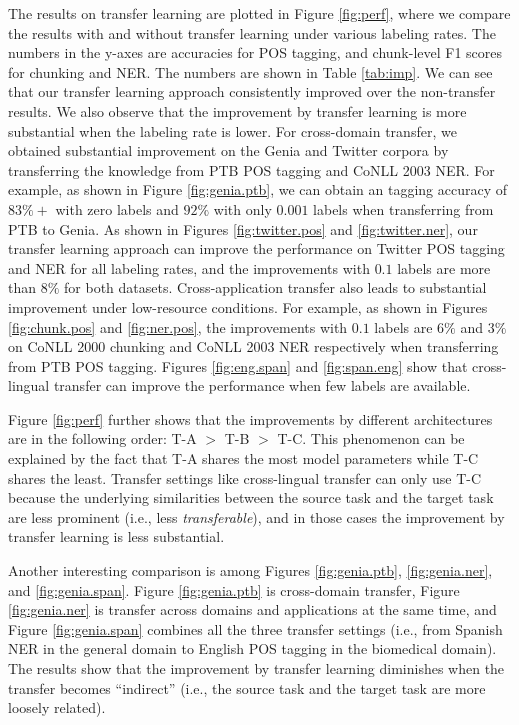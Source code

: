 The results on transfer learning are plotted in Figure \ref{fig:perf}, where we compare the results with and without transfer learning under various labeling rates. The numbers in the y-axes are accuracies for POS tagging, and chunk-level F1 scores for chunking and NER. The numbers are shown in Table \ref{tab:imp}. We can see that our transfer learning approach consistently improved over the non-transfer results. We also observe that the improvement by transfer learning is more substantial when the labeling rate is lower. For cross-domain transfer, we obtained substantial improvement on the Genia and Twitter corpora by transferring the knowledge from PTB POS tagging and CoNLL 2003 NER. For example, as shown in Figure \ref{fig:genia.ptb}, we can obtain an tagging accuracy of $83\%+$ with zero labels and $92\%$ with only $0.001$ labels when transferring from PTB to Genia. As shown in Figures \ref{fig:twitter.pos} and \ref{fig:twitter.ner}, our transfer learning approach can improve the performance on Twitter POS tagging and NER for all labeling rates, and the improvements with $0.1$ labels are more than $8\%$ for both datasets. Cross-application transfer also leads to substantial improvement under low-resource conditions. For example, as shown in Figures \ref{fig:chunk.pos} and \ref{fig:ner.pos}, the improvements with $0.1$ labels are $6\%$ and $3\%$ on CoNLL 2000 chunking and CoNLL 2003 NER respectively when transferring from PTB POS tagging. Figures \ref{fig:eng.span} and \ref{fig:span.eng} show that cross-lingual transfer can improve the performance when few labels are available.

Figure \ref{fig:perf} further shows that the improvements by different architectures are in the following order: T-A $>$ T-B $>$ T-C. This phenomenon can be explained by the fact that T-A shares the most model parameters while T-C shares the least. 
Transfer settings like cross-lingual transfer can only use T-C because the underlying similarities between the source task and the target task are less prominent (i.e., less \textit{transferable}), and in those cases the improvement by transfer learning is less substantial.

Another interesting comparison is among Figures \ref{fig:genia.ptb}, \ref{fig:genia.ner}, and \ref{fig:genia.span}. Figure \ref{fig:genia.ptb} is cross-domain transfer, Figure \ref{fig:genia.ner} is transfer across domains and applications at the same time, and Figure \ref{fig:genia.span} combines all the three transfer settings (i.e., from Spanish NER in the general domain to English POS tagging in the biomedical domain). The results show that the improvement by transfer learning diminishes when the transfer becomes ``indirect'' (i.e., the source task and the target task are more loosely related).

